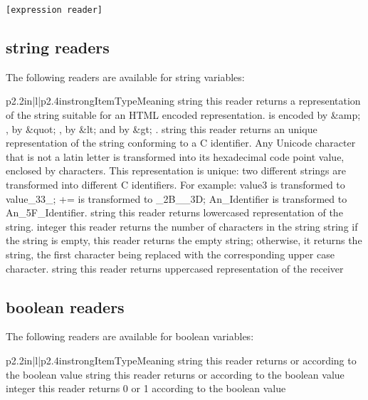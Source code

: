 \begin{lstlisting}[frame=single]
[expression reader]
\end{lstlisting}

\subsection{string readers}

The following readers are available for string variables:

\begin{longtableiii}{p{2.2in}|l|p{2.4in}}{strong}{Item}{Type}{Meaning}
  {string}
  {this reader returns a representation of the string suitable for an HTML encoded representation. \character{\&} is encoded by \&amp; ,  by \&quot; , \character{<} by \&lt; and \character{>} by \&gt; .}
  {string}
  {this reader returns an unique representation of the string conforming to a C identifier. Any Unicode character that is not a latin letter is transformed into its hexadecimal code point value, enclosed by \character{_} characters. This representation is unique: two different strings are transformed into different C identifiers. For example: value3 is transformed to value\_33\_; += is transformed to \_2B\_\_3D;
An\_Identifier is transformed to An\_5F\_Identifier.}
  {string}
  {this reader returns lowercased representation of the string.}
  {integer}
  {this reader returns the number of characters in the string}
  {string}
  {if the string is empty, this reader returns the empty string; otherwise, it returns the string, the first character being replaced with the corresponding upper case character.}
  {string}
  {this reader returns uppercased representation of the receiver}
\end{longtableiii}

\subsection{boolean readers}

The following readers are available for boolean variables:

\begin{longtableiii}{p{2.2in}|l|p{2.4in}}{strong}{Item}{Type}{Meaning}
  {string}
  {this reader returns  or  according to the boolean value}
  {string}
  {this reader returns  or  according to the boolean value}
  {integer}
  {this reader returns 0 or 1 according to the boolean value}
\end{longtableiii}

